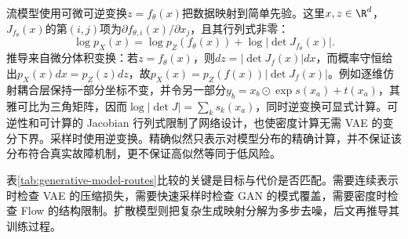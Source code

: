 流模型使用可微可逆变换$z=f_\theta(x)$把数据映射到简单先验。这里$x,z\in\R^d$，$J_{f_\theta}(x)$的第$(i,j)$项为$\partial f_{\theta,i}(x)/\partial x_j$，且其行列式非零：
\begin{equation}
 \log p_X(x)=\log p_Z(f_\theta(x))+\log\bigl|\det J_{f_\theta}(x)\bigr|.
\end{equation}
推导来自微分体积变换：若$z=f_\theta(x)$，则$d z=|\det J_f(x)|d x$，而概率守恒给出$p_X(x)dx=p_Z(z)dz$，故$p_X(x)=p_Z(f(x))|\det J_f(x)|$。例如逐维仿射耦合层保持一部分坐标不变，并令另一部分$y_b=x_b\odot\exp s(x_a)+t(x_a)$，其雅可比为三角矩阵，因而$\log|\det J|=\sum_k s_k(x_a)$，同时逆变换可显式计算。可逆性和可计算的 Jacobian 行列式限制了网络设计，也使密度计算无需 VAE 的变分下界。采样时使用逆变换。精确似然只表示对模型分布的精确计算，并不保证该分布符合真实故障机制，更不保证高似然等同于低风险。

表\ref{tab:generative-model-routes}比较的关键是目标与代价是否匹配。需要连续表示时检查 VAE 的压缩损失，需要快速采样时检查 GAN 的模式覆盖，需要密度时检查 Flow 的结构限制。扩散模型则把复杂生成映射分解为多步去噪，后文再推导其训练过程。

\begin{table}[htbp]
\centering
\caption{生成模型路线与工业应用边界}
\label{tab:generative-model-routes}
\scriptsize
\setlength{\tabcolsep}{3pt}
\end{table}

